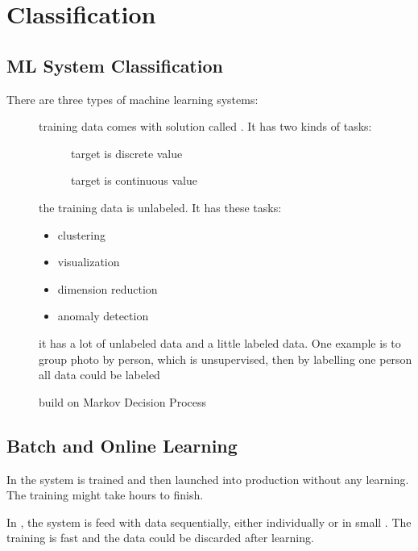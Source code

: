 \section{Classification}

\subsection{ML System Classification}
There are three types of machine learning systems:

\begin{description}
	\item [] training data comes with solution called . It has two kinds of tasks:
		\begin{description}
			\item [] target is discrete value
			\item [] target is continuous value
		\end{description}
	\item [] the training data is unlabeled. It has these tasks:
		\begin{itemize}
			\item clustering
			\item visualization 
			\item dimension reduction
			\item anomaly detection
		\end{itemize}
	\item [] it has a lot of unlabeled data and a little labeled data. One example is to group photo by person, which is unsupervised, then by labelling one person all data could be labeled
	\item [] build on Markov Decision Process
\end{description}

\subsection{Batch and Online Learning}

In  the system is trained and then launched into production without any learning. The training might take hours to finish.

In , the system is feed with data sequentially, either individually or in small . The training is fast and the data could be discarded after learning.

